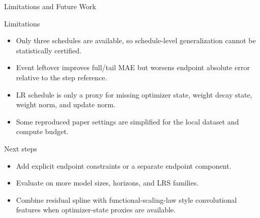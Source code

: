 \documentclass[fontset=fandol,aspectratio=169,10pt]{ctexbeamer}
\begin{document}
\begin{frame}{Limitations and Future Work}
  \begin{block}{Limitations}
    \begin{itemize}
      \item Only three schedules are available, so schedule-level generalization cannot be statistically certified.
      \item Event leftover improves full/tail MAE but worsens endpoint absolute error relative to the step reference.
      \item LR schedule is only a proxy for missing optimizer state, weight decay state, weight norm, and update norm.
      \item Some reproduced paper settings are simplified for the local dataset and compute budget.
    \end{itemize}
  \end{block}

  \begin{block}{Next steps}
    \begin{itemize}
      \item Add explicit endpoint constraints or a separate endpoint component.
      \item Evaluate on more model sizes, horizons, and LRS families.
      \item Combine residual spline with functional-scaling-law style convolutional features when optimizer-state proxies are available.
    \end{itemize}
  \end{block}
\end{frame}
\end{document}
